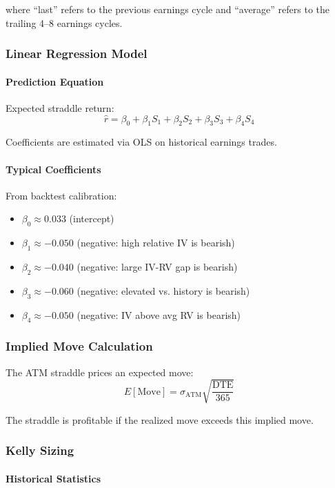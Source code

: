 where ``last'' refers to the previous earnings cycle and ``average'' refers to the trailing 4--8 earnings cycles.

\subsubsection{Linear Regression Model}

\paragraph{Prediction Equation}

Expected straddle return:
\[
\hat{r} = \beta_0 + \beta_1 S_1 + \beta_2 S_2 + \beta_3 S_3 + \beta_4 S_4
\]

Coefficients are estimated via OLS on historical earnings trades.

\paragraph{Typical Coefficients}

From backtest calibration:
\begin{itemize}
  \item $\beta_0 \approx 0.033$ (intercept)
  \item $\beta_1 \approx -0.050$ (negative: high relative IV is bearish)
  \item $\beta_2 \approx -0.040$ (negative: large IV-RV gap is bearish)
  \item $\beta_3 \approx -0.060$ (negative: elevated vs. history is bearish)
  \item $\beta_4 \approx -0.050$ (negative: IV above avg RV is bearish)
\end{itemize}

\subsubsection{Implied Move Calculation}

The ATM straddle prices an expected move:
\[
E[\text{Move}] = \sigma_{\text{ATM}} \sqrt{\frac{\text{DTE}}{365}}
\]

The straddle is profitable if the realized move exceeds this implied move.

\subsubsection{Kelly Sizing}

\paragraph{Historical Statistics}

